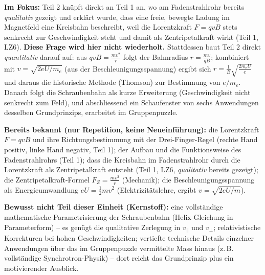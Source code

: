 \documentclass[11pt,a4paper]{article}
\begin{document}
\textbf{Im Fokus:} Teil 2 knüpft direkt an Teil 1 an, wo am
Fadenstrahlrohr bereits \emph{qualitativ} gezeigt und erklärt wurde, dass
eine freie, bewegte Ladung im Magnetfeld eine Kreisbahn beschreibt, weil
die Lorentzkraft $F=qvB$ stets senkrecht zur Geschwindigkeit steht und
damit als Zentripetalkraft wirkt (Teil 1, LZ6). \textbf{Diese Frage wird
hier nicht wiederholt.} Stattdessen baut Teil 2 direkt
\emph{quantitativ} darauf auf: aus $qvB=\frac{mv^2}{r}$ folgt der
Bahnradius $r=\frac{mv}{qB}$; kombiniert mit $v=\sqrt{2eU/m_e}$ (aus der
Beschleunigungsspannung) ergibt sich $r=\frac{1}{B}\sqrt{\frac{2m_eU}{e}}$
und daraus die historische Methode (Thomson) zur Bestimmung von $e/m_e$.
Danach folgt die Schraubenbahn als kurze Erweiterung (Geschwindigkeit
nicht senkrecht zum Feld), und abschliessend ein Schaufenster von sechs
Anwendungen desselben Grundprinzips, erarbeitet im Gruppenpuzzle.

\textbf{Bereits bekannt (nur Repetition, keine Neueinführung):} die
Lorentzkraft $F=qvB$ und ihre Richtungsbestimmung mit der
Drei-Finger-Regel (rechte Hand positiv, linke Hand negativ, Teil 1); der
Aufbau und die Funktionsweise des Fadenstrahlrohrs (Teil 1); dass die
Kreisbahn im Fadenstrahlrohr durch die Lorentzkraft als Zentripetalkraft
entsteht (Teil 1, LZ6, \emph{qualitativ} bereits gezeigt); die
Zentripetalkraft-Formel $F_Z=\frac{mv^2}{r}$ (Mechanik); die
Beschleunigungsspannung als Energieumwandlung $eU=\frac{1}{2}mv^2$
(Elektrizitätslehre, ergibt $v=\sqrt{2eU/m}$).

\textbf{Bewusst nicht Teil dieser Einheit (Kernstoff):} eine vollständige
mathematische Parametrisierung der Schraubenbahn (Helix-Gleichung in
Parameterform) -- es genügt die qualitative Zerlegung in $v_\parallel$
und $v_\perp$; relativistische Korrekturen bei hohen Geschwindigkeiten;
vertiefte technische Details einzelner Anwendungen über das im
Gruppenpuzzle vermittelte Mass hinaus (z.\,B. vollständige
Synchrotron-Physik) -- dort reicht das Grundprinzip plus ein
motivierender Ausblick.
\end{document}
